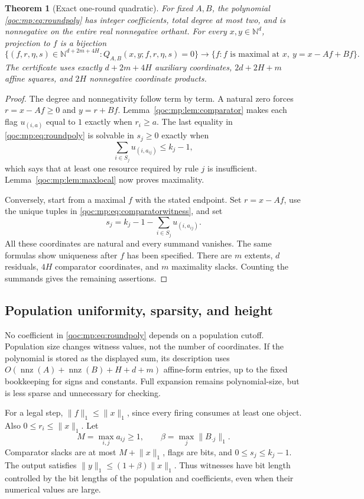 \documentclass[11pt,letterpaper]{article}
\newtheorem{theorem}{Theorem}[section]
\theoremstyle{definition}
\theoremstyle{remark}
\newcommand{\N}{\mathbb N}
\newcommand{\size}[1]{\lVert #1\rVert_1}
\begin{document}
\begin{theorem}[Exact one-round quadratic]\label{qoc:mp:thm:round}
For fixed $A,B$, the polynomial \eqref{qoc:mp:eq:roundpoly} has integer
coefficients, total degree at most two, and is nonnegative on the entire
real nonnegative orthant. For every $x,y\in\N^d$, projection to $f$ is a
bijection
\[
 \{(f,r,\eta,s)\in\N^{d+2m+4H}:Q_{A,B}(x,y;f,r,\eta,s)=0\}
 \longrightarrow
 \{f: f\text{ is maximal at }x,\ y=x-Af+Bf\}.
\]
The certificate uses exactly $d+2m+4H$ auxiliary coordinates,
$2d+2H+m$ affine squares, and $2H$ nonnegative coordinate products.
\end{theorem}
\begin{proof}
The degree and nonnegativity follow term by term. A natural zero forces
$r=x-Af\ge0$ and $y=r+Bf$. Lemma~\ref{qoc:mp:lem:comparator} makes each flag
$u_{(i,a)}$ equal to $1$ exactly when $r_i\ge a$. The last equality in
\eqref{qoc:mp:eq:roundpoly} is solvable in $s_j\ge0$ exactly when
\[
 \sum_{i\in S_j}u_{(i,a_{ij})}\le k_j-1,
\]
which says that at least one resource required by rule $j$ is insufficient.
Lemma~\ref{qoc:mp:lem:maxlocal} now proves maximality.

Conversely, start from a maximal $f$ with the stated endpoint. Set
$r=x-Af$, use the unique tuples in \eqref{qoc:mp:eq:comparatorwitness}, and set
\begin{equation}\label{qoc:mp:eq:s-witness}
 s_j=k_j-1-\sum_{i\in S_j}u_{(i,a_{ij})}.
\end{equation}
All these coordinates are natural and every summand vanishes. The same
formulas show uniqueness after $f$ has been specified. There are $m$
extents, $d$ residuals, $4H$ comparator coordinates, and $m$ maximality
slacks. Counting the summands gives the remaining assertions.
\end{proof}

\subsection{Population uniformity, sparsity, and height}
No coefficient in \eqref{qoc:mp:eq:roundpoly} depends on a population cutoff.
Population size changes witness values, not the number of coordinates.
If the polynomial is stored as the displayed sum, its description uses
$O(\operatorname{nnz}(A)+\operatorname{nnz}(B)+H+d+m)$ affine-form entries,
up to the fixed bookkeeping for signs and constants. Full expansion
remains polynomial-size, but is less sparse and unnecessary for checking.

For a legal step, $\size f\le\size x$, since every firing consumes at least
one object. Also $0\le r_i\le\size x$. Let
\[
 M=\max_{i,j}a_{ij}\ge1,\qquad
 \beta=\max_j\size{B_{\cdot j}}.
\]
Comparator slacks are at most $M+\size x$, flags are bits, and
$0\le s_j\le k_j-1$. The output satisfies
$\size y\le(1+\beta)\size x$. Thus witnesses have bit length controlled by
the bit lengths of the population and coefficients, even when their
numerical values are large.
\end{document}
